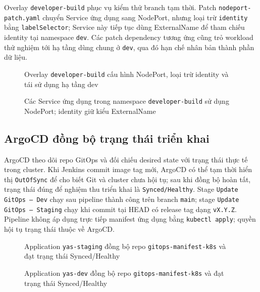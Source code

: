 Overlay \texttt{developer-build} phục vụ kiểm thử branch tạm thời. Patch \texttt{nodeport-patch.yaml} chuyển Service ứng dụng sang NodePort, nhưng loại trừ \texttt{identity} bằng \texttt{labelSelector}; Service này tiếp tục dùng ExternalName để tham chiếu identity tại namespace \texttt{dev}. Các patch dependency tương ứng cũng trỏ workload thử nghiệm tới hạ tầng dùng chung ở \texttt{dev}, qua đó hạn chế nhân bản thành phần dữ liệu.

\begin{figure}[H]
\centering
{}
\caption{Overlay \texttt{developer-build} cấu hình NodePort, loại trừ identity và tái sử dụng hạ tầng dev}
\end{figure}

\begin{figure}[H]
\centering
{}
\caption{Các Service ứng dụng trong namespace \texttt{developer-build} sử dụng NodePort; identity giữ kiểu ExternalName}
\end{figure}

\subsection{ArgoCD đồng bộ trạng thái triển khai}

ArgoCD theo dõi repo GitOps và đối chiếu desired state với trạng thái thực tế trong cluster. Khi Jenkins commit image tag mới, ArgoCD có thể tạm thời hiển thị \texttt{OutOfSync} để cho biết Git và cluster chưa hội tụ; sau khi đồng bộ hoàn tất, trạng thái đúng để nghiệm thu triển khai là \texttt{Synced/Healthy}. Stage \texttt{Update GitOps --- Dev} chạy sau pipeline thành công trên branch \texttt{main}; stage \texttt{Update GitOps --- Staging} chạy khi commit tại HEAD có release tag dạng \texttt{vX.Y.Z}. Pipeline không áp dụng trực tiếp manifest ứng dụng bằng \texttt{kubectl apply}; quyền hội tụ trạng thái thuộc về ArgoCD.

\begin{figure}[H]
\centering
{}
\caption{Application \texttt{yas-staging} đồng bộ repo \texttt{gitops-manifest-k8s} và đạt trạng thái Synced/Healthy}
\end{figure}

\begin{figure}[H]
\centering
{}
\caption{Application \texttt{yas-dev} đồng bộ repo \texttt{gitops-manifest-k8s} và đạt trạng thái Synced/Healthy}
\end{figure}

